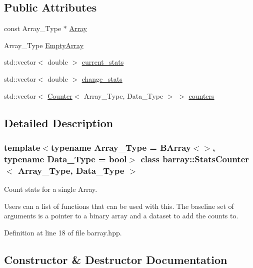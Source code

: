 \subsection*{Public Attributes}
\begin{DoxyCompactItemize}
\item 
const Array\+\_\+\+Type $\ast$ \hyperlink{classbarray_1_1_stats_counter_ab6b997c20a8da062f364796796f463bf}{Array}
\item 
Array\+\_\+\+Type \hyperlink{classbarray_1_1_stats_counter_a5882e329a534159cd0f536cab41766a2}{Empty\+Array}
\item 
std\+::vector$<$ double $>$ \hyperlink{classbarray_1_1_stats_counter_ac9472b6f14107c97555d912bd92547f1}{current\+\_\+stats}
\item 
std\+::vector$<$ double $>$ \hyperlink{classbarray_1_1_stats_counter_a36e139e694c81d9e2b7c07d816959b9d}{change\+\_\+stats}
\item 
std\+::vector$<$ \hyperlink{classbarray_1_1_counter}{Counter}$<$ Array\+\_\+\+Type, Data\+\_\+\+Type $>$ $>$ \hyperlink{classbarray_1_1_stats_counter_ad2da838a6b8235395c7c5b9c58d1c780}{counters}
\end{DoxyCompactItemize}


\subsection{Detailed Description}
\subsubsection*{template$<$typename Array\+\_\+\+Type = B\+Array$<$$>$, typename Data\+\_\+\+Type = bool$>$\newline
class barray\+::\+Stats\+Counter$<$ Array\+\_\+\+Type, Data\+\_\+\+Type $>$}

Count stats for a single Array. 

Users can a list of functions that can be used with this. The baseline set of arguments is a pointer to a binary array and a dataset to add the counts to. 

Definition at line 18 of file barray.\+hpp.



\subsection{Constructor \& Destructor Documentation}
\mbox{\label{classbarray_1_1_stats_counter_a3cbb563fbe257755837649db27a35136}} 
